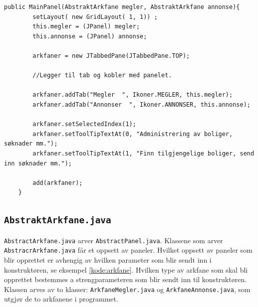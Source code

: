 \begin{lstlisting}[caption=Kontruktør i \texttt{MainPanel.java},label=kode:main_panel]
    public MainPanel(AbstraktArkfane megler, AbstraktArkfane annonse){
        setLayout( new GridLayout( 1, 1)) ;
        this.megler = (JPanel) megler;
        this.annonse = (JPanel) annonse;
        
        arkfaner = new JTabbedPane(JTabbedPane.TOP);
        
        //Legger til tab og kobler med panelet.
        
        arkfaner.addTab("Megler  ", Ikoner.MEGLER, this.megler);
        arkfaner.addTab("Annonser  ", Ikoner.ANNONSER, this.annonse);
        
        arkfaner.setSelectedIndex(1);
        arkfaner.setToolTipTextAt(0, "Administrering av boliger, søknader mm.");
        arkfaner.setToolTipTextAt(1, "Finn tilgjengelige boliger, send inn søknader mm.");
        
        add(arkfaner);
    }
\end{lstlisting}



\subsection{\texttt{AbstraktArkfane.java}}
\texttt{AbstractArkfane.java} arver \texttt{AbstractPanel.java}. Klassene som arver \texttt{AbstracrArkfane.java} får et oppsett av paneler. Hvilket oppsett av paneler som blir opprettet er avhengig av hvilken parameter som blir sendt inn i konstruktøren, se eksempel \ref{kode:arkfane}. Hvilken type av arkfane som skal bli opprettet bestemmes a strengparameteren som blir sendt inn til konstruktøren. Klassen arves av to klasser: \texttt{ArkfaneMegler.java} og \texttt{ArkfaneAnnonse.java}, som utgjør de to arkfanene i programmet. 

